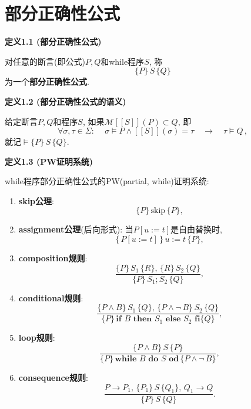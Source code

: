\documentclass[UTF8]{ctexart}
\begin{document}
\setlength{\abovedisplayskip}{1pt}
\setlength{\belowdisplayskip}{1pt}

\section{部分正确性公式}

\hypertarget{sec:定义1.1}{}
\noindent\textbf{定义1.1 (部分正确性公式)}

对任意的断言(即公式)$P,Q$和while程序$S$, 称
\[
    \{P\}\,S\,\{Q\}
\]
为一个\textbf{部分正确性公式}.

\vspace{10pt}

\hypertarget{sec:定义1.2}{}
\noindent\textbf{定义1.2 (部分正确性公式的语义)}

给定断言$P,Q$和程序$S$, 如果$\mathcal{M}[\![S]\!](P)\subset Q$, 即
\[
    \forall\sigma,\tau\in\Sigma:\quad
    \,\sigma\models P\land [\![S]\!](\sigma)=\tau\quad\to\quad\tau\models Q\,,
\]
就记$\models\{P\}\,S\,\{Q\}$.

\vspace{10pt}

\hypertarget{sec:定义1.3}{}
\noindent\textbf{定义1.3 (PW证明系统)}

while程序部分正确性公式的PW(partial, while)证明系统:
\begin{enumerate}
    \item \textbf{skip公理}:
    \[
        \{P\}\,\mathrm{skip}\,\{P\},
    \]
    \item \textbf{assignment公理}(后向形式): 当$P[u:=t]$是自由替换时,
    \[
        \{\,P[u:=t]\,\}\,u:=t\,\{P\},
    \]
    \item \textbf{composition规则}:
    \[
        \frac{\{P\}\,S_1\,\{R\},\,\{R\}\,S_2\,\{Q\}}
        {\{P\}\,S_1;S_2\,\{Q\}},
    \]
    \item \textbf{conditional规则}:
    \[
        \frac{\{P\land B\}\,S_1\,\{Q\},\,\{P\land\neg\,B\}\,S_2\,\{Q\}}
        {\{P\}\,\mathbf{if}\,\,B\,\,\mathbf{then}\,\,S_1\,\,\mathbf{else}
        \,\,S_2\,\,\mathbf{fi}\{Q\}},
    \]
    \item \textbf{loop规则}:
    \[
        \frac{\{P\land B\}\,S\,\{P\}}
        {\{P\}\,\mathbf{while}\,\,B\,\,\mathbf{do}\,\,S\,\,\mathbf{od}\,
        \{P\land\neg\,B\}},
    \]
    \item \textbf{consequence规则}:
    \[
        \frac{P\to P_1,\,\{P_1\}\,S\,\{Q_1\},\,Q_1\to Q}
        {\{P\}\,S\,\{Q\}}.
    \]
\end{enumerate}
\end{document}
